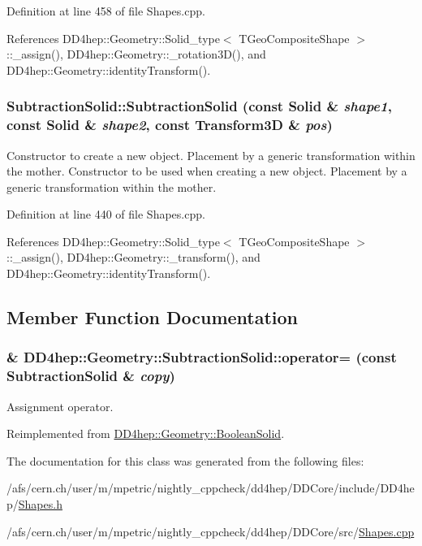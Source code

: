 Definition at line 458 of file Shapes.cpp.

References DD4hep::Geometry::Solid\_\-type$<$ TGeoCompositeShape $>$::\_\-assign(), DD4hep::Geometry::\_\-rotation3D(), and DD4hep::Geometry::identityTransform().\hypertarget{class_d_d4hep_1_1_geometry_1_1_subtraction_solid_a3e6d305e752d6f429ddbe2f2a8a2f18d}{
\subsubsection[{SubtractionSolid}]{\setlength{\rightskip}{0pt plus 5cm}SubtractionSolid::SubtractionSolid (const {\bf Solid} \& {\em shape1}, \/  const {\bf Solid} \& {\em shape2}, \/  const {\bf Transform3D} \& {\em pos})}}
\label{class_d_d4hep_1_1_geometry_1_1_subtraction_solid_a3e6d305e752d6f429ddbe2f2a8a2f18d}


Constructor to create a new object. Placement by a generic transformation within the mother. Constructor to be used when creating a new object. Placement by a generic transformation within the mother. 

Definition at line 440 of file Shapes.cpp.

References DD4hep::Geometry::Solid\_\-type$<$ TGeoCompositeShape $>$::\_\-assign(), DD4hep::Geometry::\_\-transform(), and DD4hep::Geometry::identityTransform().

\subsection{Member Function Documentation}
\hypertarget{class_d_d4hep_1_1_geometry_1_1_subtraction_solid_a6ee8427252bdb96e1549c59164ee4732}{
\subsubsection[{operator=}]{\& DD4hep::Geometry::SubtractionSolid::operator= (const {\bf SubtractionSolid} \& {\em copy})}}
\label{class_d_d4hep_1_1_geometry_1_1_subtraction_solid_a6ee8427252bdb96e1549c59164ee4732}


Assignment operator. 

Reimplemented from \hyperlink{class_d_d4hep_1_1_geometry_1_1_boolean_solid_a454e550eb5ec2c515b1c38bc8dc54914}{DD4hep::Geometry::BooleanSolid}.

The documentation for this class was generated from the following files:\begin{DoxyCompactItemize}
\item 
/afs/cern.ch/user/m/mpetric/nightly\_\-cppcheck/dd4hep/DDCore/include/DD4hep/\hyperlink{_shapes_8h}{Shapes.h}\item 
/afs/cern.ch/user/m/mpetric/nightly\_\-cppcheck/dd4hep/DDCore/src/\hyperlink{_shapes_8cpp}{Shapes.cpp}\end{DoxyCompactItemize}
